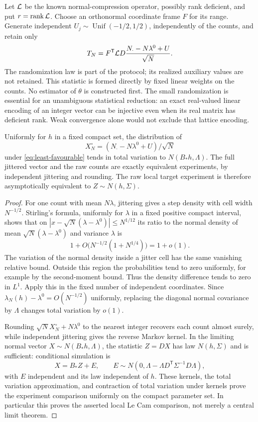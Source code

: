 Let $\mathcal L$ be the known normal-compression operator, possibly rank deficient, and put $r=\operatorname{rank}\mathcal L$. Choose an orthonormal coordinate frame $F$ for its range. Generate independent $U_j\sim\operatorname{Unif}(-1/2,1/2)$, independently of the counts, and retain only
\begin{equation}\label{eq:direct-statistic}
 T_N=F^{\mathsf T}\mathcal L D\frac{N_\cdot-N\lambda^0+U}{\sqrt N}.
\end{equation}
The randomization law is part of the protocol; its realized auxiliary values are not retained. This statistic is formed directly by fixed linear weights on the counts. No estimator of $\theta$ is constructed first. The small randomization is essential for an unambiguous statistical reduction: an exact real-valued linear encoding of an integer vector can be injective even when its real matrix has deficient rank. Weak convergence alone would not exclude that lattice encoding.

\begin{lemma}\label{lem:poisson-TV}
Uniformly for $h$ in a fixed compact set, the distribution of
\[
 X_N^\circ=(N_\cdot-N\lambda^0+U)/\sqrt N
\]
under \eqref{eq:least-favourable} tends in total variation to
$N(B_*h,\Lambda)$. The full jittered vector and the raw counts are exactly equivalent experiments, by independent jittering and rounding. The raw local target experiment is therefore asymptotically equivalent to $Z\sim N(h,\Sigma)$.
\end{lemma}
\begin{proof}
For one count with mean $N\lambda$, jittering gives a step density with cell width $N^{-1/2}$. Stirling's formula, uniformly for $\lambda$ in a fixed positive compact interval, shows that on $|x-\sqrt N(\lambda-\lambda^0)|\le N^{1/12}$ its ratio to the normal density of mean $\sqrt N(\lambda-\lambda^0)$ and variance $\lambda$ is
\[
 1+O\bigl(N^{-1/2}(1+N^{1/4})\bigr)=1+o(1).
\]
The variation of the normal density inside a jitter cell has the same vanishing relative bound. Outside this region the probabilities tend to zero uniformly, for example by the second-moment bound. Thus the density difference tends to zero in $L^1$. Apply this in the fixed number of independent coordinates. Since $\lambda_N(h)-\lambda^0=O(N^{-1/2})$ uniformly, replacing the diagonal normal covariance by $\Lambda$ changes total variation by $o(1)$.

Rounding $\sqrt N X_N^\circ+N\lambda^0$ to the nearest integer recovers each count almost surely, while independent jittering gives the reverse Markov kernel. In the limiting normal vector $X\sim N(B_*h,\Lambda)$, the statistic $Z=DX$ has law $N(h,\Sigma)$ and is sufficient: conditional simulation is
\[
 X=B_*Z+E,\qquad
 E\sim N(0,\Lambda-\Lambda D^{\mathsf T}\Sigma^{-1}D\Lambda),
\]
with $E$ independent and its law independent of $h$. These kernels, the total variation approximation, and contraction of total variation under kernels prove the experiment comparison uniformly on the compact parameter set. In particular this proves the asserted local Le Cam comparison, not merely a central limit theorem.
\end{proof}

